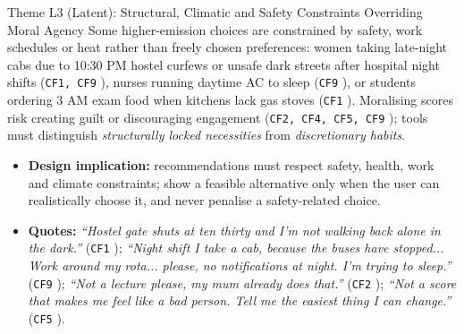 \documentclass[12pt, a4paper]{article}
\begin{document}
\begin{latentcard}{Theme L3 (Latent): Structural, Climatic and Safety Constraints Overriding Moral Agency}
Some higher-emission choices are constrained by safety, work schedules or heat rather than freely chosen preferences: women taking late-night cabs due to 10:30 PM hostel curfews or unsafe dark streets after hospital night shifts (\texttt{CF1, CF9} \cite{cf1, cf9}), nurses running daytime AC to sleep (\texttt{CF9} \cite{cf9}), or students ordering 3 AM exam food when kitchens lack gas stoves (\texttt{CF1} \cite{cf1}). Moralising scores risk creating guilt or discouraging engagement (\texttt{CF2, CF4, CF5, CF9} \cite{cf2, cf4, cf5, cf9}); tools must distinguish \textit{structurally locked necessities} from \textit{discretionary habits}.
\begin{itemize}
    \item \textbf{Design implication:} recommendations must respect safety, health, work and climate constraints; show a feasible alternative only when the user can realistically choose it, and never penalise a safety-related choice.
    \item \textbf{Quotes:} \textit{``Hostel gate shuts at ten thirty and I'm not walking back alone in the dark.''} (\texttt{CF1} \cite{cf1}); \textit{``Night shift I take a cab, because the buses have stopped... Work around my rota... please, no notifications at night. I'm trying to sleep.''} (\texttt{CF9} \cite{cf9}); \textit{``Not a lecture please, my mum already does that.''} (\texttt{CF2} \cite{cf2}); \textit{``Not a score that makes me feel like a bad person. Tell me the easiest thing I can change.''} (\texttt{CF5} \cite{cf5}).
\end{itemize}
\end{latentcard}

\end{document}
